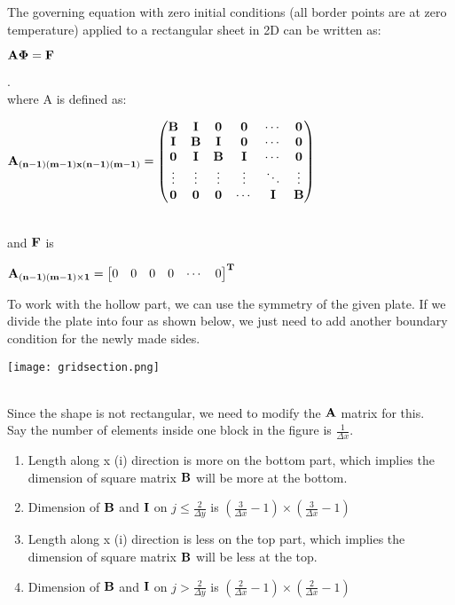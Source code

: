 \documentclass{article}
\begin{document}
The governing equation with zero initial conditions (all border points are at zero temperature) applied to a rectangular sheet in 2D can be written as:\\
\centerline{$\bf{A\Phi = F}$}.\\
where A is defined as:\\
\centerline{$\bf{A}_{(n-1)(m-1) x (n-1)(m-1)} = 
\begin{pmatrix}
    \bf{B} & \bf{I} & \bf{0} & \bf{0} & \cdots & \bf{0} \\
    \bf{I} & \bf{B} & \bf{I} & \bf{0} & \cdots & \bf{0} \\
    \bf{0} & \bf{I} & \bf{B} & \bf{I} &\cdots & \bf{0} \\
    \vdots  &  \vdots & \vdots & \vdots& \ddots & \vdots \\
    \bf{0} & \bf{0} & \bf{0} & \cdots  &  \bf{I} & \bf{B}
\end{pmatrix}$}\\
and $\bf{F}$ is\\
\centerline{$\bf{A_{(n-1)(m-1) \times 1}} = \begin{bmatrix}
    0 & 0 & 0 & 0 & \cdots & 0
\end{bmatrix}^T$}
To work with the hollow part, we can use the symmetry of the given plate. If we divide the plate into four as shown below, we just need to add another boundary condition for the newly made sides.\\
\centerline{\texttt{[image: gridsection.png]}}\\
Since the shape is not rectangular, we need to modify the $\bf{A}$ matrix for this.\\
Say the number of elements inside one block in the figure is $\frac{1}{\Delta x}$.
\begin{enumerate}
    \item Length along x (i) direction is more on the bottom part, which implies the dimension of square matrix $\bf{B}$ will be more at the bottom.
    \item Dimension of $\bf{B}$ and $\bf{I}$ on $j \leq \frac{2}{\Delta y}$ is $(\frac{3}{\Delta x}-1) \times (\frac{3}{\Delta x}-1)$
    \item Length along x (i) direction is less on the top part, which implies the dimension of square matrix $\bf{B}$ will be less at the top.
    \item Dimension of $\bf{B}$ and $\bf{I}$ on $j > \frac{2}{\Delta y}$ is $(\frac{2}{\Delta x}-1) \times (\frac{2}{\Delta x}-1)$
\end{enumerate}
\end{document}
